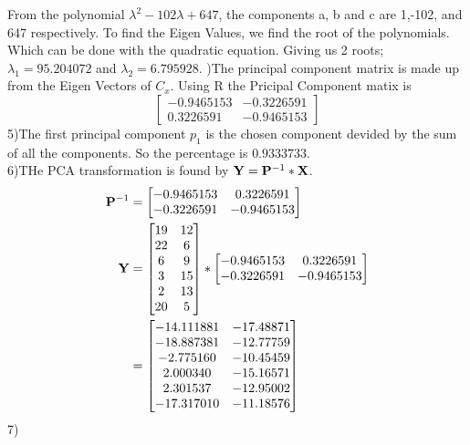 \documentclass[12pt,english]{article}
\begin{document}
From the polynomial $\lambda^{2} -102\lambda + 647 $, the components a, b and c are 1,-102, and 647 respectively. To find the Eigen Values, we find the root of the polynomials. Which can be done with the quadratic equation. Giving us 2  roots; $\lambda_{1} = 95.204072$ and $\lambda_{2} = 6.795928$.
)The principal component matrix is made up from the Eigen Vectors of $C_{x}$. Using R  the Pricipal Component matix is
\begin{equation*}
\begin{bmatrix}-0.9465153 & -0.3226591 \\0.3226591 & -0.9465153
\end{bmatrix}
\end{equation*}
5)The first principal component $p_{1}$ is the chosen component devided by the sum of all the components. So the percentage is $0.9333733$.\\
6)THe PCA transformation is found by $\bold{Y} = \bold{P}^{-1} * \bold{X}$.
\begin{equation*}
\begin{split}
\bold{P}^{-1} &=\begin{bmatrix}-0.9465153 & 0.3226591 \\-0.3226591 & -0.9465153\end{bmatrix}\\
\bold{Y} &=\begin{bmatrix}19 & 12 \\22 &  6 \\ 6  &  9 \\ 3 &  15 \\ 2 &  13 \\20 &  5 \end{bmatrix}
 *
\begin{bmatrix}-0.9465153 & 0.3226591 \\-0.3226591 & -0.9465153\end{bmatrix}\\
&=\begin{bmatrix}-14.111881 &-17.48871 \\ -18.887381 &-12.77759 \\ -2.775160 &-10.45459 \\ 2.000340 &-15.16571 \\ 2.301537 & -12.95002 \\ -17.317010 &-11.18576 \end{bmatrix}
\end{split}
\end{equation*}
7)
\end{document}
